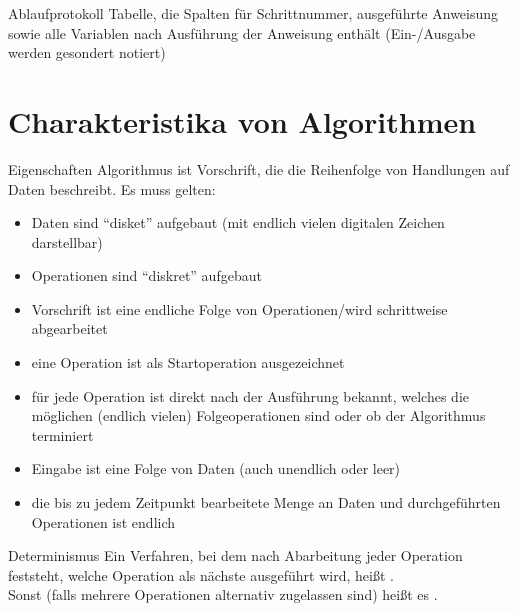 \begin{Def}{Ablaufprotokoll}
    Tabelle, die Spalten für Schrittnummer, ausgeführte Anweisung sowie
    alle Variablen nach Ausführung der Anweisung enthält (Ein-/Ausgabe werden
    gesondert notiert)
\end{Def}

\pagebreak

\section{%
    Charakteristika von Algorithmen%
}

\begin{Def}{Eigenschaften}
    Algorithmus ist Vorschrift, die die Reihenfolge von Handlungen auf Daten
    beschreibt. Es muss gelten:
    \begin{itemize}
        \item Daten sind "`disket"' aufgebaut (mit endlich vielen
        digitalen Zeichen darstellbar)

        \item Operationen sind "`diskret"' aufgebaut

        \item Vorschrift ist eine endliche Folge von Operationen/wird
        schrittweise abgearbeitet

        \item eine Operation ist als Startoperation ausgezeichnet

        \item für jede Operation ist direkt nach der Ausführung bekannt,
        welches die möglichen (endlich vielen) Folgeoperationen sind oder ob
        der Algorithmus terminiert

        \item Eingabe ist eine Folge von Daten (auch unendlich oder leer)

        \item die bis zu jedem Zeitpunkt bearbeitete Menge an Daten
        und durchgeführten Operationen ist endlich
    \end{itemize}
\end{Def}

\begin{Def}{Determinismus}
    Ein Verfahren, bei dem nach Abarbeitung jeder Operation feststeht, welche
    Operation als nächste ausgeführt wird, heißt . \\
    Sonst (falls mehrere Operationen alternativ zugelassen sind) heißt es
    .
\end{Def}

